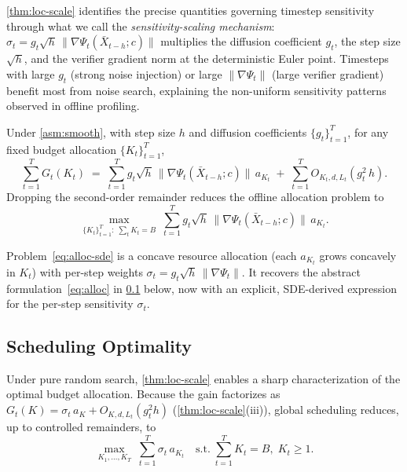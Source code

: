\begin{remark}
\cref{thm:loc-scale} identifies the precise quantities governing timestep
sensitivity through what we call the \emph{sensitivity-scaling mechanism}:
$\sigma_t = g_t\sqrt{h}\,\|\nabla\Psi_t(\bar{X}_{t-h}; c)\|$
multiplies the diffusion coefficient $g_t$, the step size
$\sqrt{h}$, and the verifier gradient norm at the
deterministic Euler point.
Timesteps with large $g_t$ (strong noise injection) or large
$\|\nabla\Psi_t\|$ (large verifier gradient) benefit most from noise
search, explaining the non-uniform sensitivity patterns observed in offline profiling.
\end{remark}

\begin{corollary}
\label{cor:sde-alloc}
Under \cref{asm:smooth}, with step size $h$ and diffusion
coefficients $\{g_t\}_{t=1}^T$, for any fixed budget allocation
$\{K_t\}_{t=1}^T$,
\begin{equation}
  \sum_{t=1}^{T} G_t(K_t)
  \;=\; \sum_{t=1}^{T} g_t\sqrt{h}\,
        \|\nabla\Psi_t(\bar{X}_{t-h}; c)\|\,a_{K_t}
  \;+\; \sum_{t=1}^{T} O_{K_t,d,L_t}(g_t^2\,h).
  \label{eq:aggregate-gain}
\end{equation}
Dropping the second-order remainder reduces the offline allocation problem
to
\begin{equation}
  \max_{\{K_t\}_{t=1}^T:\;\sum_t K_t = B}\;
  \sum_{t=1}^{T} g_t\sqrt{h}\,
  \|\nabla\Psi_t(\bar{X}_{t-h}; c)\|\,a_{K_t}.
  \label{eq:alloc-sde}
\end{equation}
\end{corollary}

\begin{remark}
Problem~\eqref{eq:alloc-sde} is a concave resource allocation (each
$a_{K_t}$ grows concavely in $K_t$) with
per-step weights $\sigma_t = g_t\sqrt{h}\,\|\nabla\Psi_t\|$.
It recovers the abstract formulation~\eqref{eq:alloc} in
\cref{sec:scheduling-optimality} below, now with an explicit,
SDE-derived expression for the per-step sensitivity $\sigma_t$.
\end{remark}

\subsection{Scheduling Optimality}
\label{sec:scheduling-optimality}

Under pure random search, \cref{thm:loc-scale} enables a sharp
characterization of the optimal budget allocation.
Because the gain factorizes as
$G_t(K) = \sigma_t\,a_K + O_{K,d,L_t}(g_t^2 h)$ (\cref{thm:loc-scale}(iii)),
global scheduling reduces, up to controlled remainders, to
\begin{equation}
  \max_{K_1,\dots,K_T}\;\sum_{t=1}^{T}\sigma_t\,a_{K_t}
  \quad\text{s.t.}\;\sum_{t=1}^{T}K_t=B,\;K_t\ge 1.
  \label{eq:alloc}
\end{equation}

